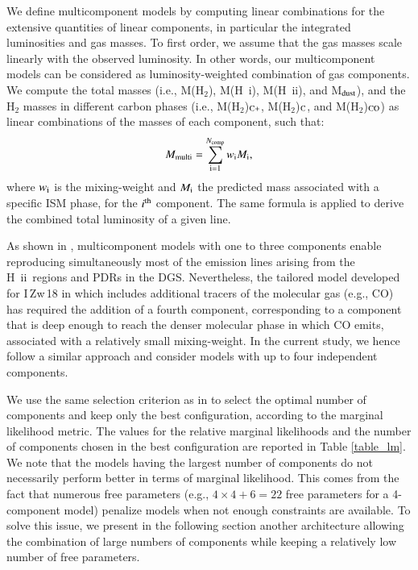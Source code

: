 \documentclass{aa}
\newcommand{\hi}{H~{\sc i}}
\newcommand{\hii}{H~{\sc ii}}
\begin{document}
We define multicomponent models by computing linear combinations for the extensive quantities of linear components, in particular the integrated luminosities and gas masses. To first order, we assume that the gas masses scale linearly with the observed luminosity. In other words, our multicomponent models can be considered as luminosity-weighted combination of gas components. We compute the total masses (i.e., M(H$_2$), M(\hi), M(\hii), and M$_{\rm dust}$), and the H$_2$ masses in different carbon phases (i.e., M(H$_2$)$_{\rm C+}$, M(H$_2$)$_{\rm C}$, and M(H$_2$)$_{\rm CO}$) as linear combinations of the masses of each component, such that:
\begin{equation}
    M_{\rm multi}= \sum_{\rm i=1}^{N_{\rm comp}} w_{\rm i} M_{\rm i},
\end{equation}
where $w_{\rm i}$ is the mixing-weight and $M_{\rm i}$ the predicted mass associated with a specific ISM phase, for the $i^{\rm th}$ component. The same formula is applied to derive the combined total luminosity of a given line.

As shown in \cite{Ramambason2022}, multicomponent models with one to three components enable reproducing simultaneously most of the emission lines arising from the \hii\ regions and PDRs in the DGS. Nevertheless, the tailored model developed for I\,Zw\,18 in \cite{LebouteillerRamambason2022} which includes additional tracers of the molecular gas (e.g., CO) has required the addition of a fourth component, corresponding to a component that is deep enough to reach the denser molecular phase in which CO emits, associated with a relatively small mixing-weight. In the current study, we hence follow a similar approach and consider models with up to four independent components.


We use the same selection criterion as in \cite{Ramambason2022} to select the optimal number of components and keep only the best configuration, according to the marginal likelihood metric. The values for the relative marginal likelihoods and the number of components chosen in the best configuration are reported in Table \ref{table_lm}. We note that the models having the largest number of components do not necessarily perform better in terms of marginal likelihood. This comes from the fact that numerous free parameters (e.g., $4\times4+6=22$ free parameters for a 4-component model) penalize models when not enough constraints are available. To solve this issue, we present in the following section another architecture allowing the combination of large numbers of components while keeping a relatively low number of free parameters. 
\end{document}
